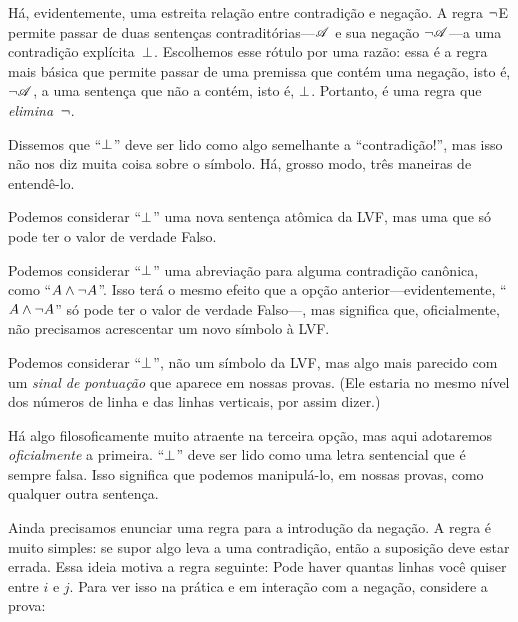 Há, evidentemente, uma estreita relação entre contradição e negação.
A regra $\neg$E permite passar de duas sentenças contraditórias---$\mathscr{A}$ e sua negação $\neg \mathscr{A}$---a uma contradição explícita~$\bot$. Escolhemos esse rótulo por uma razão: essa é a regra mais básica que permite passar de uma premissa que contém uma negação, isto é, $\neg\mathscr{A}$, a uma sentença que não a contém, isto é, $\bot$. Portanto, é uma regra que \emph{elimina}~$\neg$.

Dissemos que \textquotedblleft$\bot$\textquotedblright{} deve ser lido como algo semelhante a \textquotedblleft{}contradição!\textquotedblright{}, mas isso não nos diz muita coisa sobre o símbolo. Há, grosso modo, três maneiras de entendê-lo.
	\begin{compactlist}
		\item Podemos considerar \textquotedblleft$\bot$\textquotedblright{} uma nova sentença atômica da LVF, mas uma que só pode ter o valor de verdade Falso.
		\item Podemos considerar \textquotedblleft$\bot$\textquotedblright{} uma abreviação para alguma contradição canônica, como \textquotedblleft$A \wedge \neg A$\textquotedblright{}. Isso terá o mesmo efeito que a opção anterior---evidentemente, \textquotedblleft$A \wedge \neg A$\textquotedblright{} só pode ter o valor de verdade Falso---, mas significa que, oficialmente, não precisamos acrescentar um novo símbolo à LVF.
		\item Podemos considerar \textquotedblleft$\bot$\textquotedblright{}, não um símbolo da LVF, mas algo mais parecido com um \emph{sinal de pontuação} que aparece em nossas provas. (Ele estaria no mesmo nível dos números de linha e das linhas verticais, por assim dizer.)
	\end{compactlist}
Há algo filosoficamente muito atraente na terceira opção, mas aqui adotaremos \emph{oficialmente} a primeira. \textquotedblleft$\bot$\textquotedblright{} deve ser lido como uma letra sentencial que é sempre falsa. Isso significa que podemos manipulá-lo, em nossas provas, como qualquer outra sentença.

Ainda precisamos enunciar uma regra para a introdução da negação. A regra é muito simples: se supor algo leva a uma contradição, então a suposição deve estar errada. Essa ideia motiva a regra seguinte:
Pode haver quantas linhas você quiser entre $i$ e $j$. Para ver isso na prática e em interação com a negação, considere a prova:
	\begin{fitchproof}
		\AS
		\open
			\AS
		\close
	\end{fitchproof}

